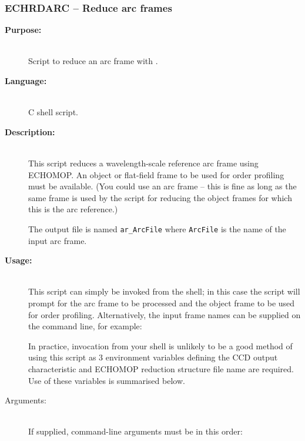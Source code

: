 \documentclass[twoside,11pt]{starlink}
\providecommand{\scspec}[2]{#1}
\begin{document}
\newpage
\subsubsection{\label{se_echrdarc}ECHRDARC
                \scspec{--}{-} Reduce arc frames}


\begin{description}

\item [\textbf{Purpose:}] \mbox{} \\
     Script to reduce an arc frame with .

\item [\textbf{Language:}] \mbox{} \\
     C shell script.

\item [\textbf{Description:}] \mbox{} \\
     This script reduces a wavelength-scale reference arc frame using
     ECHOMOP.  An object or flat-field frame to be used for order
     profiling must be available.  (You could use an arc frame
     \scspec{--}{-} this is fine as long as the same frame is
     used by the script 
     for reducing the object frames for which this is the arc
     reference.)

     The output file is named \verb+ar_ArcFile+ where \verb+ArcFile+ is
     the name of the input arc frame.

\item [\textbf{Usage:}] \mbox{} \\
     This script can simply be invoked from the shell; in this case
     the script will prompt for the arc frame to be processed and the
     object frame to be used for order profiling.
     Alternatively, the input frame names can be supplied on the
     command line, for example:

\begin{terminalv}
\end{terminalv}

     In practice, invocation from your shell is unlikely to be a good
     method of using this script as 3 environment variables defining
     the CCD output characteristic and ECHOMOP reduction structure file
     name are required.  Use of these variables is summarised below.

\item [Arguments:] \mbox{} \\
     If supplied, command-line arguments must be in this order:


\end{description}
\end{document}
